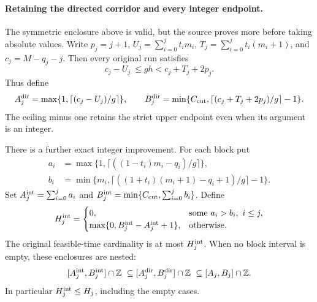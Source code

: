 \documentclass[11pt]{article}
\theoremstyle{remark}\newtheorem{remark}[proposition]{Remark}
\begin{document}
\paragraph{Retaining the directed corridor and every integer endpoint.}
The symmetric enclosure above is valid, but the source proves more before
taking absolute values. Write \(p_j=j+1\),
\(U_j=\sum_{i=0}^j t_i m_i\), \(T_j=\sum_{i=0}^j t_i(m_i+1)\), and
\(c_j=M-q_j-j\). Then every original run satisfies
\begin{equation}\label{eq:shaik-moving-directed-corridor}
 c_j-U_j\ \le gh<c_j+T_j+2p_j.
\end{equation}
Thus define
\[
 A_j^{\rm dir}=\max\{1,\lceil(c_j-U_j)/g\rceil\},\qquad
 B_j^{\rm dir}=\min\{C_{\rm cut},
           \lceil(c_j+T_j+2p_j)/g\rceil-1\}.
\]
The ceiling minus one retains the strict upper endpoint even when its
argument is an integer.

There is a further exact integer improvement. For each block put
\begin{align*}
 a_i&=\max\{1,\lceil((1-t_i)m_i-q_i)/g\rceil\},\\
 b_i&=\min\{m_i,\lceil((1+t_i)(m_i+1)-q_i+1)/g\rceil-1\}.
\end{align*}
Set \(A_j^{\rm int}=\sum_{i=0}^j a_i\) and
\(B_j^{\rm int}=\min\{C_{\rm cut},\sum_{i=0}^j b_i\}\). Define
\begin{equation}\label{eq:shaik-moving-blockwise-support}
 H_j^{\rm int}=
 \begin{cases}
  0,&\text{some }a_i>b_i,\ i\le j,\\
  \max\{0,B_j^{\rm int}-A_j^{\rm int}+1\},&\text{otherwise}.
 \end{cases}
\end{equation}
The original feasible-time cardinality is at most \(H_j^{\rm int}\).
When no block interval is empty, these enclosures are nested:
\[
 [A_j^{\rm int},B_j^{\rm int}]\cap\mathbb Z
 \ \subseteq [A_j^{\rm dir},B_j^{\rm dir}]\cap\mathbb Z
 \ \subseteq [A_j,B_j]\cap\mathbb Z .
\]
In particular \(H_j^{\rm int}\le H_j\), including the empty cases.
\end{document}
